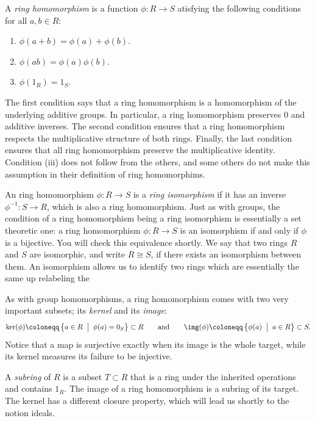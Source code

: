 \documentclass[12pt,reqno]{amsart}
\begin{document}
A \emph{ring homomorphism} is a function $\phi:R\to S$ atisfying the following conditions for all $a,b\in R$:
\begin{enumerate}[label=(\roman*)]
\item $\phi(a+b)=\phi(a)+\phi(b)$.
\item $\phi(ab)=\phi(a)\phi(b)$.
\item $\phi(1_R)=1_S$.
\end{enumerate}
The first condition says that a ring homomorphism is a homomorphism of the underlying additive groups. In particular, a ring homomorphism preserves $0$ and additive inverses. The second condition ensures that a ring homomorphism respects the multiplicative structure of both rings. Finally, the last condition ensures that all ring homomorphism preserve the multiplicative identity.  Condition (iii) does not follow from the others, and some others do not make this assumption in their definition of ring homomorphims. 

An ring homomorphism $\phi:R \to S$ is a \emph{ring isomorphism} if it has an inverse $\phi^{-1}:S\to R$, which is also a ring homomorphism. Just as with groups, the condition of a ring homomorphism being a ring isomorphism is essentially a set theoretic one: a ring homomorphism $\phi:R \to S$ is an isomorphism if and only if $\phi$ is a bijective. You will check this equivalence shortly. We say that two rings $R$ and $S$ are isomorphic, and write $R\cong S$, if there exists an isomorphism between them. An isomorphism allows us to identify two rings which are essentially the same up relabeling the 

As with group homomorphisms, a ring homomorphism comes with two very important subsets; its \emph{kernel} and its \emph{image}:
\[
\ker(\phi) \coloneqq \left\{ a \in R \;\; \big| \;\; \phi(a) = 0_S \right\}\subset R \qquad \text{and} \qquad \img(\phi) \coloneqq \left\{\phi(a) \;\; \big| \;\; a \in R\right\} \subset S.
\]
Notice that a map is surjective exactly when its image is the whole target, while its kernel measures its failure to be injective.

A \emph{subring} of $R$ is a subset $T \subset R$ that is a ring under the inherited operations and contains $1_R$. The image of a ring homomorphism is a subring of its target. The kernel has a different closure property, which will lead us shortly to the notion ideals.

\hrulefill
\end{document}
